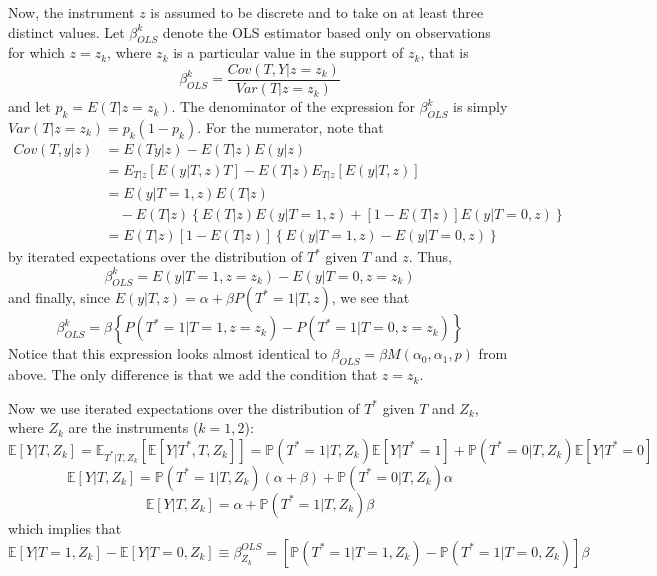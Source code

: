 Now, the instrument $z$ is assumed to be discrete and to take on at least three distinct values.
Let $\beta_{OLS}^k$ denote the OLS estimator based only on observations for which $z = z_k$, where $z_k$ is a particular value in the support of $z_k$, that is
\begin{equation*}
  \beta_{OLS}^k = \frac{Cov(T,Y| z = z_k)}{Var(T|z=z_k)} 
\end{equation*}
and let $p_k = E(T|z=z_k)$.
The denominator of the expression for $\beta_{OLS}^k$ is simply $Var(T|z=z_k) = p_k(1-p_k)$.
For the numerator, note that
\begin{align*}
  Cov(T,y|z) &= E(Ty|z) - E(T|z)E(y|z)\\
  &= E_{T|z}\left[E\left( y|T,z \right)T  \right] - E(T|z) E_{T|z}\left[ E(y|T,z) \right]\\
  &= E(y|T=1,z)E(T|z)\\
  &\quad - E(T|z)\left\{ E(T|z)E(y|T=1,z) + [1 - E(T|z)]E(y|T=0,z) \right\}\\
  &= E(T|z)\left[ 1-E(T|z) \right]\left\{ E(y|T=1,z) - E(y|T=0,z) \right\}
\end{align*}
by iterated expectations over the distribution of $T^*$ given $T$ and $z$.
Thus, 
\begin{equation*}
  \beta_{OLS}^k = E\left( y | T=1,z=z_k \right) - E(y|T=0,z=z_k)
\end{equation*}
and finally, since $E(y|T,z) = \alpha + \beta P(T^*=1|T,z)$, we see that
\begin{equation*}
  \beta_{OLS}^k = \beta \left\{P\left( T^*=1|T=1,z=z_k \right) - P(T^*=1|T=0, z=z_k)  \right\}
\end{equation*}
Notice that this expression looks almost identical to $\beta_{OLS} = \beta M(\alpha_0, \alpha_1, p)$ from above.
The only difference is that we add the condition that $z=z_k$.
 

Now we use iterated expectations over the distribution of $T^{*}$
given $T$ and $Z_{k}$, where $Z_{k}$ are the instruments ($k=1,2$):
\[
\mathbb{E}[Y|T,Z_{k}]=\mathbb{E}_{T^{*}|T,Z_{k}}\left[\mathbb{E}[Y|T^{*},T,Z_{k}]\right]=\mathbb{P}(T^{*}=1|T,Z_{k})\mathbb{E}[Y|T^{*}=1]+\mathbb{P}(T^{*}=0|T,Z_{k})\mathbb{E}[Y|T^{*}=0]
\]
\[
\mathbb{E}[Y|T,Z_{k}]=\mathbb{P}(T^{*}=1|T,Z_{k})(\alpha+\beta)+\mathbb{P}(T^{*}=0|T,Z_{k})\alpha
\]
\[
\mathbb{E}[Y|T,Z_{k}]=\alpha+\mathbb{P}(T^{*}=1|T,Z_{k})\beta
\]
which implies that
\[
\mathbb{E}[Y|T=1,Z_{k}]-\mathbb{E}[Y|T=0,Z_{k}]\equiv\beta_{Z_{k}}^{OLS}=\left[\mathbb{P}(T^{*}=1|T=1,Z_{k})-\mathbb{P}(T^{*}=1|T=0,Z_{k})\right]\beta
\]


